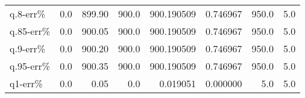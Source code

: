 \begin{tabular}{lrrrrrrr}
q.8-err\%  &    0.0 &  899.90 &    900.0 &  900.190509 &  0.746967 &              950.0 &                5.0 \\
q.85-err\% &    0.0 &  900.05 &    900.0 &  900.190509 &  0.746967 &              950.0 &                5.0 \\
q.9-err\%  &    0.0 &  900.20 &    900.0 &  900.190509 &  0.746967 &              950.0 &                5.0 \\
q.95-err\% &    0.0 &  900.35 &    900.0 &  900.190509 &  0.746967 &              950.0 &                5.0 \\
q1-err\%   &    0.0 &    0.05 &      0.0 &    0.019051 &  0.000000 &                5.0 &                5.0 \\
\bottomrule
\end{tabular}

